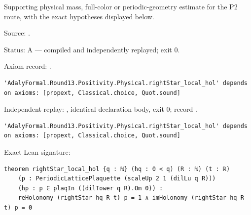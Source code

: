 \begin{theorem}[bp-494]
\label{bp-494}
\leanok
Supporting physical mass, full-color or periodic-geometry estimate for the P2 route, with the exact hypotheses displayed below.

\par Source: \texttt{}.
\par Status: A — compiled and independently replayed; exit 0.
\par Axiom record: \texttt{}.
\begin{verbatim}
'AdalyFormal.Round13.Positivity.Physical.rightStar_local_hol' depends on axioms: [propext, Classical.choice, Quot.sound]
\end{verbatim}
\par Independent replay: \texttt{}, identical declaration body, exit 0; record \texttt{}.
\begin{verbatim}
'AdalyFormal.Round13.Positivity.Physical.rightStar_local_hol' depends on axioms: [propext, Classical.choice, Quot.sound]
\end{verbatim}
\par Exact Lean signature:
\begin{verbatim}
theorem rightStar_local_hol {q : ℕ} (hq : 0 < q) (R : ℕ) (t : ℝ)
    (p : PeriodicLatticePlaquette (scaleUp 2 1 (dilLu q R)))
    (hp : p ∈ plaqIn ((dilTower q R).Om 0)) :
    reHolonomy (rightStar hq R t) p = 1 ∧ imHolonomy (rightStar hq R t) p = 0
\end{verbatim}
\end{theorem}

